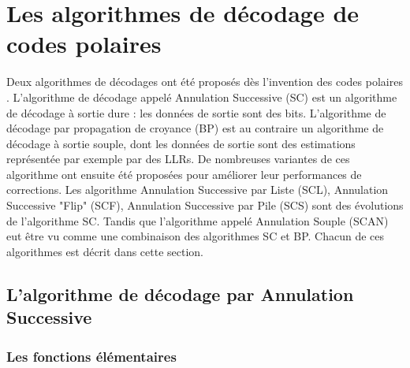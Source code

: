 \section{Les algorithmes de décodage de codes polaires}

Deux algorithmes de décodages ont été proposés dès l'invention des codes polaires \cite{arikan_channel_2009}. L'algorithme de décodage appelé Annulation Successive (SC) est un algorithme de décodage à sortie dure : les données de sortie sont des bits. L'algorithme de décodage par propagation de croyance (BP) est au contraire un algorithme de décodage à sortie souple, dont les données de sortie sont des estimations représentée par exemple par des LLRs. De nombreuses variantes de ces algorithme ont ensuite été proposées pour améliorer leur performances de corrections. Les algorithme Annulation Successive par Liste (SCL), Annulation Successive "Flip" (SCF), Annulation Successive par Pile (SCS) sont des évolutions de l'algorithme SC. Tandis que l'algorithme appelé Annulation Souple (SCAN) eut être vu comme une combinaison des algorithmes SC et BP. Chacun de ces algorithmes est décrit dans cette section.

\subsection{L'algorithme de décodage par Annulation Successive}

\subsubsection{Les fonctions élémentaires}

